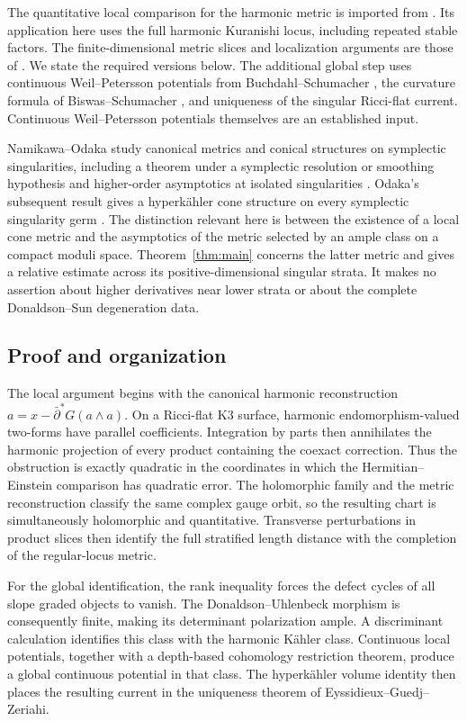 The quantitative local comparison for the harmonic metric is
imported from \cite[Theorem~1.1(iii)]{wuebben15}. Its application
here uses the full harmonic Kuranishi locus, including repeated
stable factors. The finite-dimensional metric slices and
localization arguments are those of \cite[Sections~4--6]{wuebben14}.
We state the required versions below. The additional global step
uses continuous Weil--Petersson potentials from
Buchdahl--Schumacher \cite[Theorem~11]{buchdahl21}, the curvature
formula of Biswas--Schumacher \cite[Proposition~4.3]{biswas16},
and uniqueness of the singular Ricci-flat current. Continuous
Weil--Petersson potentials themselves are an established input.

Namikawa--Odaka study canonical metrics and conical structures on
symplectic singularities, including a theorem under a symplectic
resolution or smoothing hypothesis and higher-order asymptotics
at isolated singularities \cite[Theorem~1.1 and Corollary~6.8]{no26}.
Odaka's subsequent result gives a hyperk\"ahler cone structure on
every symplectic singularity germ \cite[Corollary~1.3]{odaka26}.
The distinction relevant here is between the existence of a local
cone metric and the asymptotics of the metric selected by an ample
class on a compact moduli space. Theorem~\ref{thm:main} concerns
the latter metric and gives a relative estimate across its
positive-dimensional singular strata. It makes no assertion about
higher derivatives near lower strata or about the complete
Donaldson--Sun degeneration data.

\subsection{Proof and organization}
The local argument begins with the canonical harmonic
reconstruction $a=x-\bar\partial^*G(a\wedge a)$.
On a Ricci-flat K3 surface, harmonic endomorphism-valued
two-forms have parallel coefficients. Integration by parts
then annihilates the harmonic projection of every product
containing the coexact correction. Thus the obstruction
is exactly quadratic in the coordinates in which the
Hermitian--Einstein comparison has quadratic error.
The holomorphic family and the metric reconstruction
classify the same complex gauge orbit, so the resulting
chart is simultaneously holomorphic and quantitative.
Transverse perturbations in product slices then identify
the full stratified length distance with the completion
of the regular-locus metric.

For the global identification, the rank inequality forces
the defect cycles of all slope graded objects to vanish.
The Donaldson--Uhlenbeck morphism is consequently finite,
making its determinant polarization ample. A discriminant
calculation identifies this class with the harmonic
K\"ahler class. Continuous local potentials, together
with a depth-based cohomology restriction theorem, produce
a global continuous potential in that class. The
hyperk\"ahler volume identity then places the resulting
current in the uniqueness theorem of
Eyssidieux--Guedj--Zeriahi.

